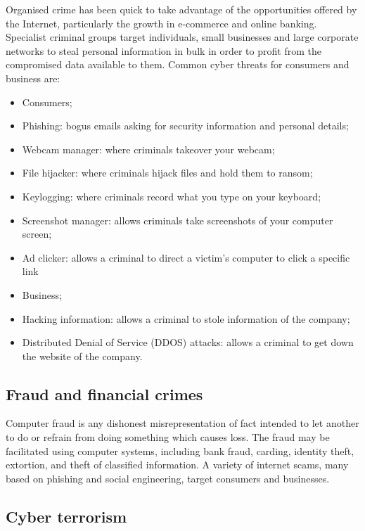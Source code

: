 \documentclass[12pt]{article}
\begin{document}
Organised crime has been quick to take advantage of the opportunities offered by the Internet, particularly the growth in e-commerce and online banking. Specialist criminal groups target individuals, small businesses and large corporate networks to steal personal information in bulk in order to profit from the compromised data available to them. Common cyber threats for consumers and business are:

\begin{itemize}
    \item Consumers;
    \item Phishing: bogus emails asking for security information and personal details;
    \item Webcam manager: where criminals takeover your webcam;
    \item File hijacker: where criminals hijack files and hold them to ransom;
    \item Keylogging: where criminals record what you type on your keyboard;
    \item Screenshot manager: allows criminals take screenshots of your computer screen;
    \item Ad clicker: allows a criminal to direct a victim’s computer to click a specific link
    \item Business;
    \item Hacking information: allows a criminal to stole information of the company;
    \item Distributed Denial of Service (DDOS) attacks: allows a criminal to get down the website of the company. 
\end{itemize}

\subsection{Fraud and financial crimes}
Computer fraud is any dishonest misrepresentation of fact intended to let another to do or refrain from doing something which causes loss. The fraud may be facilitated using computer systems, including bank fraud, carding, identity theft, extortion, and theft of classified information. A variety of internet scams, many based on phishing and social engineering, target consumers and businesses.

\subsection{Cyber terrorism}
\end{document}
